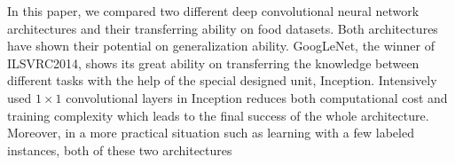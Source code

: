 In this paper, we compared two different deep convolutional neural network architectures and their transferring ability on food datasets. Both architectures have shown their potential on generalization ability. GoogLeNet, the winner of ILSVRC2014, shows its great ability on transferring the knowledge between different tasks with the help of the special designed unit, Inception. Intensively used $1\times 1$ convolutional layers in Inception reduces both computational cost and training complexity which leads to the final success of the whole architecture. Moreover, in a more practical situation such as learning with a few labeled instances, both of these two architectures  